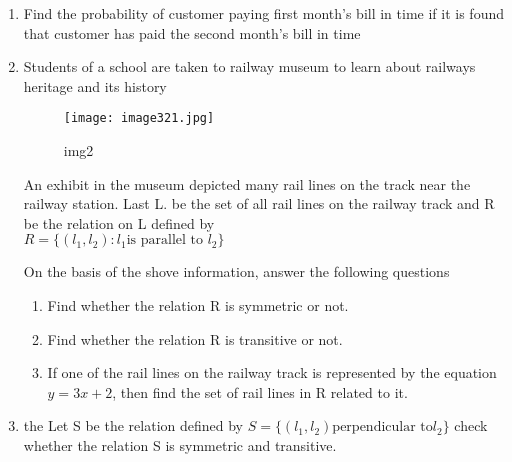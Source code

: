\documentclass{article}
\begin{document}
\begin{enumerate}
\item Find the probability of customer paying first month's bill in time if it is found that customer has paid the second month's bill in time

\item Students of a school are taken to railway museum to learn about railways heritage and its history
\newpage
\begin{figure}[h!] 
\centering  
\texttt{[image: image321.jpg]} 
\caption{img2}
\label{fig:image321}                      
\end{figure}

An exhibit in the museum depicted many rail lines on the track near the railway station. Last L. be the set of all rail lines on the railway track and R be the relation on L defined by\\
$R = \{(l_1, l_2):l_1 \text{is parallel to }l_2\}$

On the basis of the shove information, answer the following questions
\begin{enumerate}
\item Find whether the relation R is symmetric or not.
\item Find whether the relation R is transitive or not.
\item If one of the rail lines on the railway track is represented by the equation $y=3x+ 2$, then find the set of rail lines in R related to it.
\end{enumerate}
\item the Let S be the relation defined by $ S = \{(l_1,l_2)\text{perpendicular to} l_2\}$ check whether the relation S is symmetric and transitive.
\end{enumerate}
\end{document}
